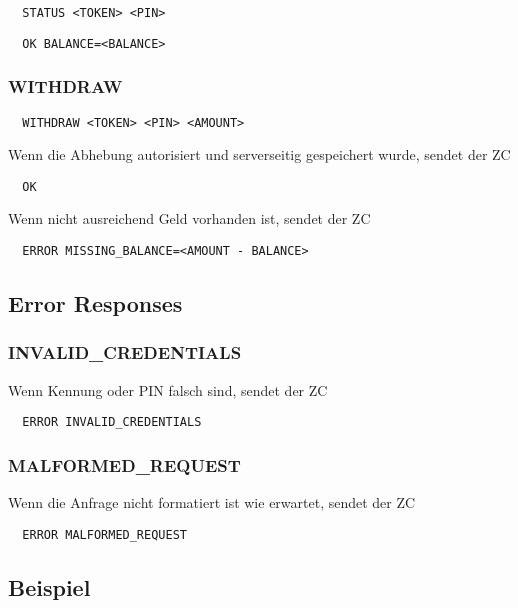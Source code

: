 \documentclass[10pt,a4paper]{article}
\begin{document}
\begin{lstlisting}
  STATUS <TOKEN> <PIN>
\end{lstlisting}

\begin{lstlisting}
  OK BALANCE=<BALANCE>
\end{lstlisting}

\subsubsection{WITHDRAW}

\begin{lstlisting}
  WITHDRAW <TOKEN> <PIN> <AMOUNT>
\end{lstlisting}

Wenn die Abhebung autorisiert und serverseitig gespeichert wurde, sendet der ZC
\begin{lstlisting}
  OK
\end{lstlisting}

Wenn nicht ausreichend Geld vorhanden ist, sendet der ZC
\begin{lstlisting}
  ERROR MISSING_BALANCE=<AMOUNT - BALANCE>
\end{lstlisting}

\subsection{Error Responses}

\subsubsection{INVALID\_CREDENTIALS}

Wenn Kennung oder PIN falsch sind, sendet der ZC

\begin{lstlisting}
  ERROR INVALID_CREDENTIALS
\end{lstlisting}

\subsubsection{MALFORMED\_REQUEST}

Wenn die Anfrage nicht formatiert ist wie erwartet, sendet der ZC

\begin{lstlisting}
  ERROR MALFORMED_REQUEST
\end{lstlisting}

\subsection{Beispiel}
\end{document}
